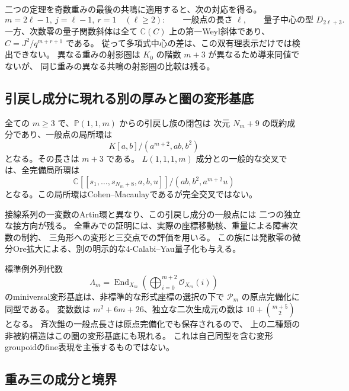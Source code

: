 二つの定理を奇数重みの最後の共鳴に適用すると、次の対応を得る。
\[
 \boxed{
 m=2\ell-1,\ j=\ell-1,\ r=1\quad(\ell\ge2):\qquad
 \text{一般点の長さ }\ell,\qquad
 \text{量子中心の型 }D_{2\ell+3}.
 }
\]
一方、次数零の量子関数斜体は全て
$\mathbb C(C)$ 上の第一Weyl斜体であり、$C=J^2/q^{m+r+1}$ である。
従って多項式中心の差は、この双有理表示だけでは検出できない。
異なる重みの射影圏は $K_0$ の階数 $m+3$ が異なるため導来同値でないが、
同じ重みの異なる共鳴の射影圏の比較は残る。

\subsection{引戻し成分に現れる別の厚みと圏の変形基底}

\begin{theorem}[引戻し成分]
\label{thm:main-v33}
全ての $m\ge3$ で、$\mathbb P(1,1,m)$ からの引戻し族の閉包は
次元 $N_m+9$ の既約成分であり、一般点の局所環は
\[
 K[a,b]/(a^{m+2},ab,b^2)
\]
となる。その長さは $m+3$ である。
$L(1,1,1,m)$ 成分との一般的な交叉では、全完備局所環は
\[
 \mathbb C[[s_1,\ldots,s_{N_m+8},a,b,u]]/(ab,b^2,a^{m+2}u)
\]
となる。この局所環はCohen--Macaulayであるが完全交叉ではない。
\end{theorem}

接線系列の一変数のArtin環と異なり、この引戻し成分の一般点には
二つの独立な接方向が残る。
全重みでの証明には、実際の座標移動核、重量による障害次数の制約、
三角形への変形と三交点での評価を用いる。
この族には発散零の微分Ore拡大による、別の明示的な4-Calabi--Yau量子化も与える。

標準例外列代数
\[
 \Lambda_m=\operatorname{End}_{X_m}
       \left(\bigoplus_{i=0}^{m+2}\mathcal O_{X_m}(i)\right)
\]
のminiversal変形基底は、非標準的な形式座標の選択の下で
$\mathscr P_m$ の原点完備化に同型である。
変数数は $m^2+6m+26$、独立な二次生成元の数は $10+\binom{m+5}{2}$ となる。
斉次錐の一般点長さは原点完備化でも保存されるので、
上の二種類の非被約構造はこの圏の変形基底にも現れる。
これは自己同型を含む変形groupoidのfine表現を主張するものではない。

\subsection{重み三の成分と境界}

